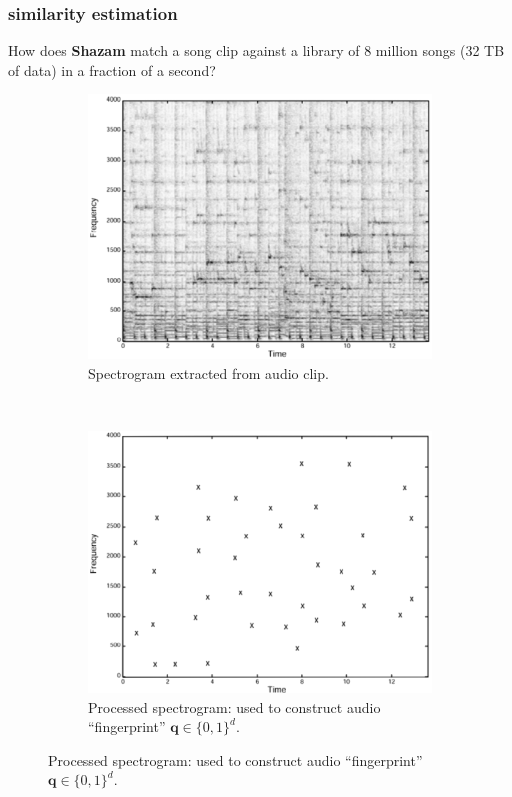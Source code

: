 \documentclass[compress]{beamer}
\begin{document}
\begin{frame}
	\frametitle{similarity estimation}
	\begin{center}
		How does \textbf{Shazam} match a song clip against a library of 8 million songs (32 TB of data) in a fraction of a second?
	\end{center}
	\vspace{-1em}
		\begin{figure}[h]
			\centering
			\begin{subfigure}[t]{0.35\textwidth}
				\centering
				\includegraphics[width=\textwidth]{spectrogram.png}
				\caption{Spectrogram extracted from audio clip.}
			\end{subfigure}
			~
			\begin{subfigure}[t]{0.35\textwidth}
				\centering
				\includegraphics[width=\textwidth]{spectrogramThresh.png}
				\caption{Processed spectrogram: used to construct audio ``fingerprint'' $\textbf{q}\in \{0,1\}^d$.}
			\end{subfigure}
		\end{figure}
		

\end{frame}
\end{document}
